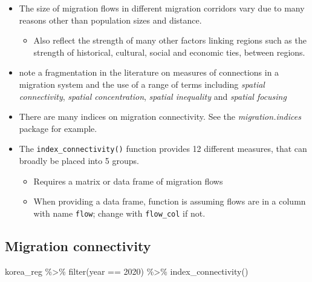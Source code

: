 \documentclass[
]{book}
\newenvironment{Shaded}{\begin{snugshade}}{\end{snugshade}}
\newcommand{\DecValTok}[1]{\textcolor[rgb]{0.00,0.00,0.81}{#1}}
\newcommand{\FunctionTok}[1]{\textcolor[rgb]{0.00,0.00,0.00}{#1}}
\newcommand{\NormalTok}[1]{#1}
\newcommand{\SpecialCharTok}[1]{\textcolor[rgb]{0.00,0.00,0.00}{#1}}
\providecommand{\tightlist}{%
  \setlength{\itemsep}{0pt}\setlength{\parskip}{0pt}}
\begin{document}
\begin{itemize}
\tightlist
\item
  The size of migration flows in different migration corridors vary due to many reasons other than population sizes and distance.

  \begin{itemize}
  \tightlist
  \item
    Also reflect the strength of many other factors linking regions such as the strength of historical, cultural, social and economic ties, between regions.
  \end{itemize}
\item
  \citet{Bell2002} note a fragmentation in the literature on measures of connections in a migration system and the use of a range of terms including \emph{spatial connectivity}, \emph{spatial concentration}, \emph{spatial inequality} and \emph{spatial focusing}
\item
  There are many indices on migration connectivity. See the \emph{migration.indices} package for example.
\item
  The \texttt{index\_connectivity()} function provides 12 different measures, that can broadly be placed into 5 groups.

  \begin{itemize}
  \tightlist
  \item
    Requires a matrix or data frame of migration flows
  \item
    When providing a data frame, function is assuming flows are in a column with name \texttt{flow}; change with \texttt{flow\_col} if not.
  \end{itemize}
\end{itemize}

\hypertarget{migration-connectivity-1}{%
\subsection{Migration connectivity}\label{migration-connectivity-1}}

\begin{Shaded}
\begin{Highlighting}[]
\NormalTok{korea\_reg }\SpecialCharTok{\%\textgreater{}\%}
  \FunctionTok{filter}\NormalTok{(year }\SpecialCharTok{==} \DecValTok{2020}\NormalTok{) }\SpecialCharTok{\%\textgreater{}\%}
  \FunctionTok{index\_connectivity}\NormalTok{()}
\end{Highlighting}
\end{Shaded}
\end{document}
